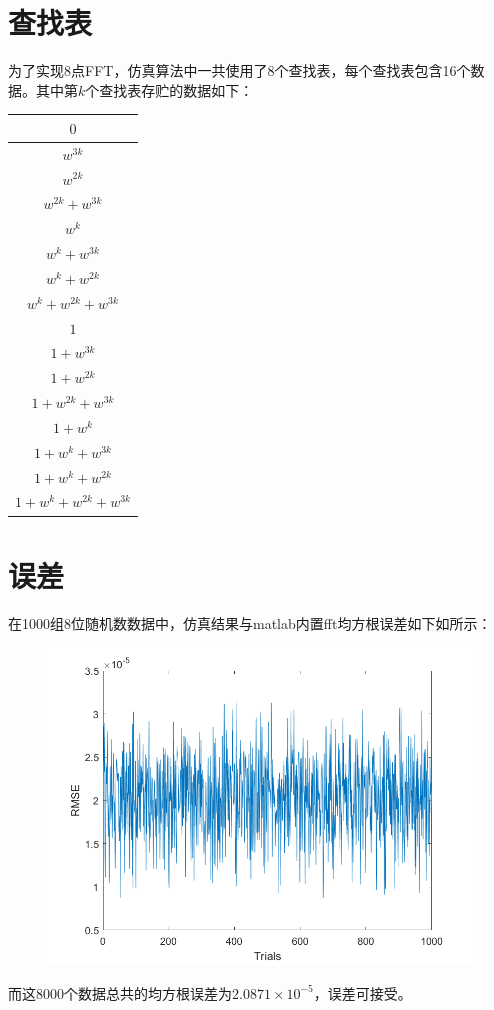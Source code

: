 \documentclass[a4paper, 12pt]{ctexart}
\begin{document}
\section{查找表}

为了实现8点FFT，仿真算法中一共使用了8个查找表，每个查找表包含16个数据。其中第$k$个查找表存贮的数据如下：

\begin{table}[h]
    \centering
    \begin{tabular}{|c|}
        \hline
        $0$\\
        \hline $w^{3k}$\\
        \hline $w^{2k}$\\
        \hline $w^{2k} + w^{3k}$\\
        \hline $w^{k}$\\
        \hline $w^{k} + w^{3k}$\\
        \hline $w^{k} + w^{2k}$\\
        \hline $w^{k} + w^{2k} + w^{3k}$\\
        \hline $1$\\
        \hline $1 + w^{3k}$\\
        \hline $1 + w^{2k}$\\
        \hline $1 + w^{2k} + w^{3k}$\\
        \hline $1 + w^{k}$\\
        \hline $1 + w^{k} + w^{3k}$\\
        \hline $1 + w^{k} + w^{2k}$\\
        \hline $1 + w^{k} + w^{2k} + w^{3k}$\\
        \hline
    \end{tabular}
\end{table}


\section{误差}

在1000组8位随机数数据中，仿真结果与matlab内置fft均方根误差如下如所示：
\begin{figure}[ht]
    \centering
    \includegraphics[width=0.7\linewidth]{error.png}
\end{figure}

而这8000个数据总共的均方根误差为$2.0871 \times 10^{-5}$，误差可接受。
\end{document}

